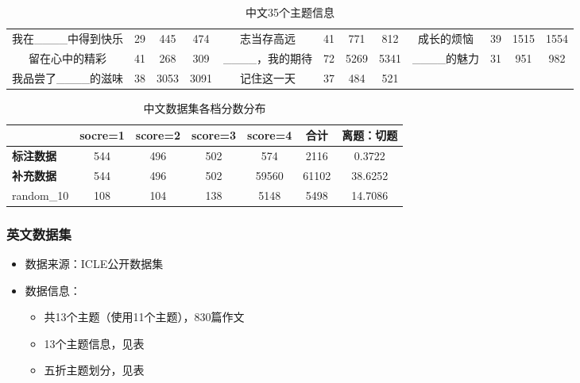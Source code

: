 \documentclass[11pt]{article}
\begin{document}
\begin{CJK}{UTF8}{gkai}
\begin{table}[htbp]
{\begin{tabular}{cccc|cccc|cccc}
      我在\_\_\_\_中得到快乐 & 29    & 445   & 474   & 志当存高远 & 41    & 771   & 812   & \textcolor[rgb]{ .502,  .502,  .502}{成长的烦恼} & \textcolor[rgb]{ .502,  .502,  .502}{39} & \textcolor[rgb]{ .502,  .502,  .502}{1515} & \textcolor[rgb]{ .502,  .502,  .502}{1554} \\
      留在心中的精彩 & 41    & 268   & 309   & \textcolor[rgb]{ .502,  .502,  .502}{\_\_\_\_，我的期待} & \textcolor[rgb]{ .502,  .502,  .502}{72} & \textcolor[rgb]{ .502,  .502,  .502}{5269} & \textcolor[rgb]{ .502,  .502,  .502}{5341} & \_\_\_\_的魅力 & 31    & 951   & 982 \\
      \textcolor[rgb]{ .502,  .502,  .502}{我品尝了\_\_\_\_的滋味} & \textcolor[rgb]{ .502,  .502,  .502}{38} & \textcolor[rgb]{ .502,  .502,  .502}{3053} & \textcolor[rgb]{ .502,  .502,  .502}{3091} & 记住这一天 & 37    & 484   & 521   & \textcolor[rgb]{ .502,  .502,  .502}{} & \textcolor[rgb]{ .502,  .502,  .502}{} & \textcolor[rgb]{ .502,  .502,  .502}{} & \textcolor[rgb]{ .502,  .502,  .502}{} \\
      \hline
    \end{tabular}}%
  \caption{中文35个主题信息}
  \label{tab:addlabel}%
\end{table}%


\begin{table}[htbp]
  \centering
  \begin{tabular}{ccccccc}
    \hline
    & \textbf{socre=1} & \textbf{score=2} & \textbf{score=3} & \textbf{score=4} & \textbf{合计} & \multicolumn{1}{p{5.94em}}{离题：切题} \\
    \hline
    \multicolumn{1}{l}{\textbf{标注数据}} & 544   & 496   & 502   & 574   & 2116  & 0.3722  \\
    \hline
    \multicolumn{1}{l}{\textbf{补充数据}} & 544   & 496   & 502   & 59560 & 61102 & 38.6252  \\
    \hline
    random\_10 & 108   & 104   & 138   & 5148  & 5498  & 14.7086  \\
    \hline
  \end{tabular}%
  \caption{中文数据集各档分数分布}
  \label{tab:addlabel}%
\end{table}%


\subsubsection{英文数据集}
\begin{itemize}
  \item 数据来源：ICLE公开数据集
  \item 数据信息：
  \begin{itemize}
    \item 共13个主题（使用11个主题），830篇作文
    \item 13个主题信息，见表
    \item 五折主题划分，见表
  \end{itemize}
\end{itemize}


\end{CJK}
\end{document}
